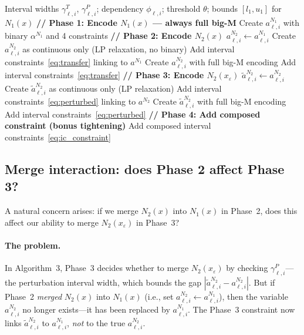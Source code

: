 \documentclass[11pt]{article}
\newcommand{\layerl}{\ell}
\begin{document}
\begin{algorithm}[H]
\caption{Hybrid variable management for neuron $(\layerl, i)$}
\begin{algorithmic}[1]
\Require Interval widths $\gamma^T_{\layerl,i}$, $\gamma^P_{\layerl,i}$;
         dependency $\phi_{\layerl,i}$; threshold $\theta$;
         bounds $[l_1, u_1]$ for $N_1(x)$
\State \textbf{// Phase 1: Encode $N_1(x)$ --- always full big-M}
\State Create $a^{N_1}_{\layerl,i}$ with binary $\alpha^{N_1}$ and 4 constraints
\Statex
\State \textbf{// Phase 2: Encode $N_2(x)$}
\If{$\gamma^T_{\layerl,i} = 0$ \textbf{or} $\phi_{\layerl,i} = 0$}
    \State $a^{N_2}_{\layerl,i} \gets a^{N_1}_{\layerl,i}$
\ElsIf{$\gamma^T_{\layerl,i} < \theta$}
    \State Create $a^{N_2}_{\layerl,i}$ as continuous only (LP relaxation, no binary)
    \State Add interval constraints~\eqref{eq:transfer} linking to $a^{N_1}$
\Else
    \State Create $a^{N_2}_{\layerl,i}$ with full big-M encoding
    \State Add interval constraints~\eqref{eq:transfer}
\EndIf
\Statex
\State \textbf{// Phase 3: Encode $N_2(x_\varepsilon)$}
\If{$\gamma^P_{\layerl,i} = 0$}
    \State $\tilde{a}^{N_2}_{\layerl,i} \gets a^{N_2}_{\layerl,i}$
\ElsIf{$\gamma^P_{\layerl,i} < \theta$}
    \State Create $\tilde{a}^{N_2}_{\layerl,i}$ as continuous only (LP relaxation)
    \State Add interval constraints~\eqref{eq:perturbed} linking to $a^{N_2}$
\Else
    \State Create $\tilde{a}^{N_2}_{\layerl,i}$ with full big-M encoding
    \State Add interval constraints~\eqref{eq:perturbed}
\EndIf
\Statex
\State \textbf{// Phase 4: Add composed constraint (bonus tightening)}
    \State Add composed interval constraints~\eqref{eq:ic_constraint}
\EndIf
\end{algorithmic}
\end{algorithm}

\subsection{Merge interaction: does Phase 2 affect Phase 3?}
\label{sec:merge_interaction}

A natural concern arises: if we merge $N_2(x)$ into $N_1(x)$ in Phase~2,
does this affect our ability to merge $N_2(x_\varepsilon)$ in Phase~3?

\paragraph{The problem.}
In Algorithm~3, Phase~3 decides whether to merge $N_2(x_\varepsilon)$ by
checking $\gamma^P_{\ell,i}$---the perturbation interval width, which
bounds the gap $|\tilde{a}^{N_2}_{\ell,i} - a^{N_2}_{\ell,i}|$.
But if Phase~2 \emph{merged} $N_2(x)$ into $N_1(x)$ (i.e., set
$a^{N_2}_{\ell,i} \gets a^{N_1}_{\ell,i}$), then the variable
$a^{N_2}_{\ell,i}$ no longer exists---it has been replaced by
$a^{N_1}_{\ell,i}$. The Phase~3 constraint now links
$\tilde{a}^{N_2}_{\ell,i}$ to $a^{N_1}_{\ell,i}$, \emph{not} to the
true $a^{N_2}_{\ell,i}$.
\end{document}
